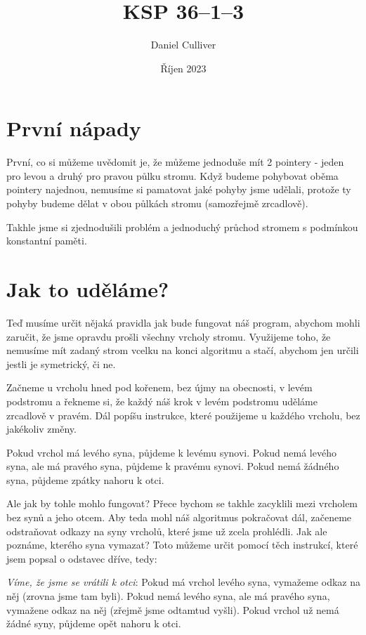 \documentclass{../../../ksp}
\title{KSP 36--1--3}
\author{Daniel Culliver}
\date{Říjen 2023}
\begin{document}
\maketitle

\section*{První nápady}

První, co si můžeme uvědomit je, že můžeme jednoduše mít 2 pointery - jeden pro levou a druhý pro pravou půlku stromu.
Když budeme pohybovat oběma pointery najednou, nemusíme si pamatovat jaké pohyby jsme udělali,
protože ty pohyby budeme dělat v obou půlkách stromu (samozřejmě zrcadlově).

Takhle jsme si zjednodušili problém a jednoduchý průchod stromem s podmínkou konstantní paměti.

\section*{Jak to uděláme?}

Teď musíme určit nějaká pravidla jak bude fungovat náš program, abychom mohli zaručit,
že jsme opravdu prošli všechny vrcholy stromu. Využijeme toho, že nemusíme mít zadaný strom vcelku
na konci algoritmu a stačí, abychom jen určili jestli je symetrický, či ne.

Začneme u vrcholu hned pod kořenem, bez újmy na obecnosti, v levém podstromu a řekneme si, že každý
náš krok v levém podstromu uděláme zrcadlově v pravém. Dál popíšu instrukce,
které použijeme u každého vrcholu, bez jakékoliv změny.

Pokud vrchol má levého syna, půjdeme k levému synovi. Pokud nemá levého syna, ale má pravého syna,
půjdeme k pravému synovi. Pokud nemá žádného syna, půjdeme zpátky nahoru k otci.

Ale jak by tohle mohlo fungovat? Přece bychom se takhle zacyklili mezi vrcholem bez synů a jeho otcem.
Aby teda mohl náš algoritmus pokračovat dál, začeneme odstraňovat odkazy na syny vrcholů,
které jsme už zcela prohlédli. Jak ale poznáme, kterého syna vymazat? Toto můžeme určit pomocí těch
instrukcí, které jsem popsal o odstavec dříve, tedy:

\emph{Víme, že jsme se vrátili k otci}: Pokud má vrchol levého syna, vymažeme odkaz na něj (zrovna jsme tam byli).
Pokud nemá levého syna, ale má pravého syna, vymažene odkaz na něj (zřejmě jsme odtamtud vyšli).
Pokud vrchol už nemá žádné syny, půjdeme opět nahoru k otci.
\end{document}
